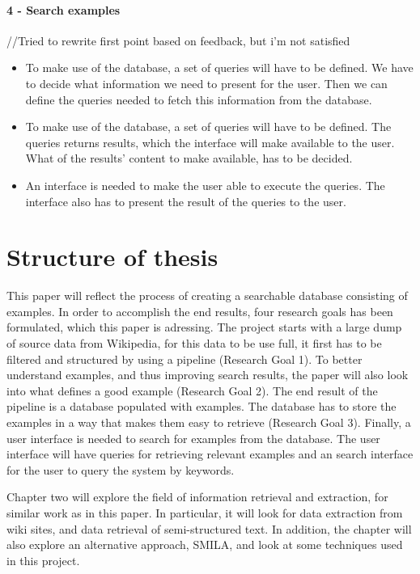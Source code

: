 \paragraph{4 - Search examples }
//Tried to rewrite first point based on feedback, but i'm not satisfied
\begin{itemize}
    \item To make use of the database, a set of queries will have to be defined. We have to decide what information we need to present for the user. Then we can define the queries needed to fetch this information from the database.
    \item To make use of the database, a set of queries will have to be defined. The queries returns results, which the interface will make available to the user. What of the results' content to make available, has to be decided.
    \item An interface is needed to make the user able to execute the queries. The interface also has to present the result of the queries to the user.
\end{itemize}


\section{Structure of thesis}
This paper will reflect the process of creating a searchable database consisting of examples. In order to accomplish the end results, four research goals has been formulated, which this paper is adressing. The project starts with a large dump of source data from Wikipedia, for this data to be use full, it first has to be filtered and structured by using a pipeline (Research Goal 1). To better understand examples, and thus improving search results, the paper will also look into what defines a good example (Research Goal 2). The end result of the pipeline is a database populated with examples. The database has to store the examples in a way that makes them easy to retrieve (Research Goal 3). Finally, a user interface is needed to search for examples from the database. The user interface will have queries for retrieving relevant examples and an search interface for the user to query the system by keywords. 

Chapter two will explore the field of information retrieval and extraction, for similar work as in this paper. In particular, it will look for data extraction from wiki sites, and data retrieval of semi-structured text. In addition, the chapter will also explore an alternative approach, SMILA, and look at some techniques used in this project.

